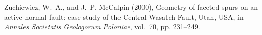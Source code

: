 \begin{thebibliography}{50}
Zuchiewicz, W.~A., and J.~P. McCalpin (2000), {Geometry of faceted spurs on an
  active normal fault: case study of the Central Wasatch Fault, Utah, USA}, in
  \textit{Annales Societatis Geologorum Poloniae}, vol.~70, pp. 231--249.

\end{thebibliography}

















%
%
%
%
%
%
%
%
%
%


